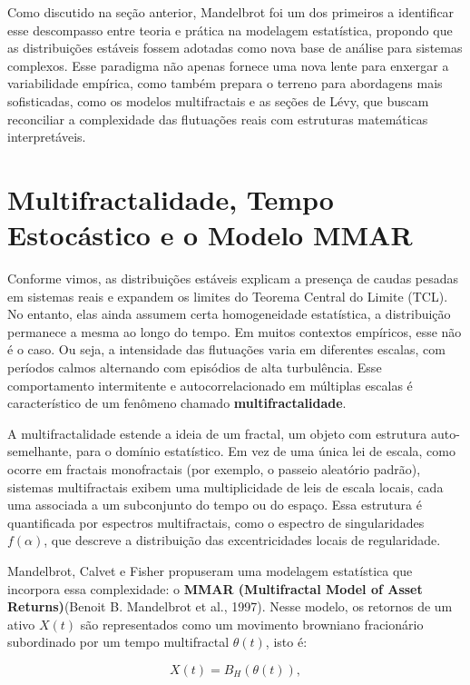 \documentclass[
]{agujournal2019}
\begin{document}
Como discutido na seção anterior, Mandelbrot foi um dos primeiros a
identificar esse descompasso entre teoria e prática na modelagem
estatística, propondo que as distribuições estáveis fossem adotadas como
nova base de análise para sistemas complexos. Esse paradigma não apenas
fornece uma nova lente para enxergar a variabilidade empírica, como
também prepara o terreno para abordagens mais sofisticadas, como os
modelos multifractais e as seções de Lévy, que buscam reconciliar a
complexidade das flutuações reais com estruturas matemáticas
interpretáveis.

\section{Multifractalidade, Tempo Estocástico e o Modelo
MMAR}\label{multifractalidade-tempo-estocuxe1stico-e-o-modelo-mmar}

Conforme vimos, as distribuições estáveis explicam a presença de caudas
pesadas em sistemas reais e expandem os limites do Teorema Central do
Limite (TCL). No entanto, elas ainda assumem certa homogeneidade
estatística, a distribuição permanece a mesma ao longo do tempo. Em
muitos contextos empíricos, esse não é o caso. Ou seja, a intensidade
das flutuações varia em diferentes escalas, com períodos calmos
alternando com episódios de alta turbulência. Esse comportamento
intermitente e autocorrelacionado em múltiplas escalas é característico
de um fenômeno chamado \textbf{multifractalidade}.

A multifractalidade estende a ideia de um fractal, um objeto com
estrutura auto-semelhante, para o domínio estatístico. Em vez de uma
única lei de escala, como ocorre em fractais monofractais (por exemplo,
o passeio aleatório padrão), sistemas multifractais exibem uma
multiplicidade de leis de escala locais, cada uma associada a um
subconjunto do tempo ou do espaço. Essa estrutura é quantificada por
espectros multifractais, como o espectro de singularidades
\(f(\alpha)\), que descreve a distribuição das excentricidades locais de
regularidade.

Mandelbrot, Calvet e Fisher propuseram uma modelagem estatística que
incorpora essa complexidade: o \textbf{MMAR (Multifractal Model of Asset
Returns)}(Benoit B. Mandelbrot et al., 1997). Nesse modelo, os retornos
de um ativo \(X(t)\) são representados como um movimento browniano
fracionário subordinado por um tempo multifractal \(\theta(t)\), isto é:

\[
X(t) = B_H(\theta(t)),
\]
\end{document}
